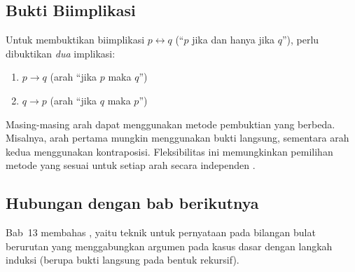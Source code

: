 \subsection{Bukti Biimplikasi}

Untuk membuktikan biimplikasi $p \leftrightarrow q$ (``$p$ jika dan hanya jika $q$''), perlu dibuktikan \emph{dua} implikasi:
\begin{enumerate}
    \item $p \rightarrow q$ (arah ``jika $p$ maka $q$'')
    \item $q \rightarrow p$ (arah ``jika $q$ maka $p$'')
\end{enumerate}

Masing-masing arah dapat menggunakan metode pembuktian yang berbeda. Misalnya, arah pertama mungkin menggunakan bukti langsung, sementara arah kedua menggunakan kontraposisi. Fleksibilitas ini memungkinkan pemilihan metode yang sesuai untuk setiap arah secara independen \cite{hammack2018}.

\subsection{Hubungan dengan bab berikutnya}

Bab~13 membahas , yaitu teknik untuk pernyataan pada bilangan bulat berurutan yang menggabungkan argumen pada kasus dasar dengan langkah induksi (berupa bukti langsung pada bentuk rekursif).
